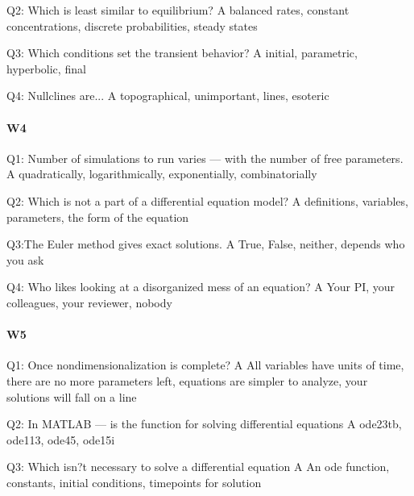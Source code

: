 Q2: Which is least similar to equilibrium?
A balanced rates, constant concentrations, discrete probabilities, steady states

Q3: Which conditions set the transient behavior?
A initial, parametric, hyperbolic, final

Q4: Nullclines are...
A topographical, unimportant, lines, esoteric

\paragraph{W4}
Q1: Number of simulations to run varies --- with the number of free parameters.
A quadratically, logarithmically, exponentially, combinatorially

Q2: Which is not a part of a differential equation model?
A definitions, variables, parameters, the form of the equation

Q3:The Euler method gives exact solutions.
A True, False, neither, depends who you ask

Q4: Who likes looking at a disorganized mess of an equation?
A Your PI, your colleagues, your reviewer, nobody

\paragraph{W5}
Q1: Once nondimensionalization is complete?
A All variables have units of time, there are no more parameters left, equations are simpler to analyze, your solutions will fall on a line

Q2: In MATLAB --- is the function for solving differential equations
A ode23tb, ode113, ode45, ode15i

Q3: Which isn?t necessary to solve a differential equation
A An ode function, constants, initial conditions, timepoints for solution
